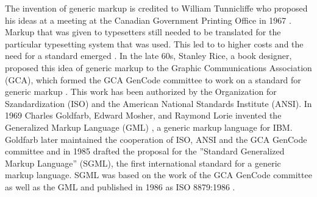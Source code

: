 The invention of generic markup is credited to William Tunnicliffe who proposed his ideas at a meeting at the Canadian
Government Printing Office in 1967 \cite{Goldfarb:1991:SH:102902}. Markup that was given to typesetters still needed to be translated for the particular typesetting system that was used. This led to to higher costs and the need for a standard emerged \cite{watsonhistory}. In the late 60s, Stanley Rice, a book designer, proposed this idea of generic markup to the Graphic Communications Association (GCA), which formed the GCA GenCode committee to work on a standard for generic markup \cite{Goldfarb:1991:SH:102902}. This work has been authorized by the Organization for Szandardization (ISO) and the American National Standards Institute (ANSI). In 1969 Charles Goldfarb, Edward Mosher, and Raymond Lorie invented the Generalized Markup Language (GML) \cite{watsonhistory}, a generic markup language for IBM. Goldfarb later maintained the cooperation of ISO, ANSI and the GCA GenCode committee and in 1985 drafted the proposal for the ''Standard Generalized Markup Language'' (SGML), the first international standard for a generic markup language. SGML was based on the work of the GCA GenCode committee as well as the GML \cite{Goldfarb:1991:SH:102902} and published in 1986 as ISO 8879:1986 \cite{ISO8879}.






